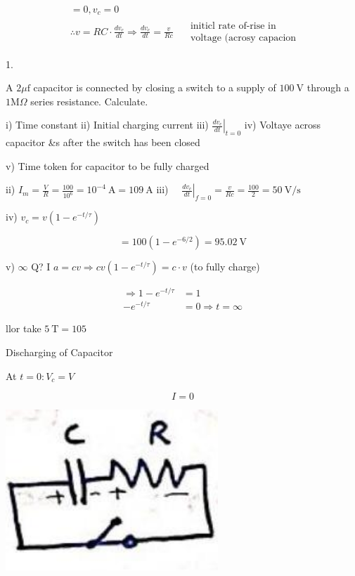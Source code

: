 \documentclass[12pt, a4paper]{article}
\newcommand{\figwidth}{8cm}
\begin{document}
$$
	\begin{aligned}
		 & =0, v_{c}=0                                                                                                                      \\
		 & \therefore v=R C \cdot \frac{d v_{c}}{d t} \Rightarrow \frac{d v_{c}}{d t}=\frac{v}{R c} \quad \begin{array}{l}
			                                                                                                  \text { initicl rate of-rise in } \\
			                                                                                                  \text { voltage (acrosy capacion }
		                                                                                                  \end{array}
	\end{aligned}
$$

1.

A $2 \mu \mathrm{f}$ capacitor is connected by closing a switch to a supply of $100 \mathrm{~V}$ through a $1 \mathrm{M} \Omega$ series resistance. Calculate.

i) Time constant ii) Initial charging current iii) $\left.\frac{d v_{c}}{d t}\right|_{t=0}$ iv) Voltaye across capacitor \&s after the switch has been closed

v) Time token for capacitor to be fully charged

ii) $I_{m}=\frac{V}{R}=\frac{100}{10^{6}}=10^{-4} \mathrm{~A}=109 \mathrm{~A}$ iii) $\left.\quad \frac{d v_{c}}{d t}\right|_{f=0}=\frac{v}{R c}=\frac{100}{2}=50 \mathrm{~V} / \mathrm{s}$

iv) $v_{c}=v\left(1-e^{-t / \tau}\right)$

$$
	=100\left(1-e^{-6 / 2}\right)=95.02 \mathrm{~V}
$$

v) $\infty$ Q? I $a=c v \Rightarrow c v\left(1-e^{-t / \tau}\right)=c \cdot v$ (to fully charge)

$$
	\begin{aligned}
		\Rightarrow 1-e^{-t / \tau} & =1                      \\
		-e^{-t / \tau}              & =0 \Rightarrow t=\infty
	\end{aligned}
$$

llor take $5 \mathrm{~T}=105$

Discharging of Capacitor

At $t=0: V_{c}=V$

$$
	I=0
$$

\begin{center}
	\includegraphics[max width=\figwidth]{2024_06_15_ae1c13e212c06c234cc4g-01(1)}
\end{center}
\end{document}
